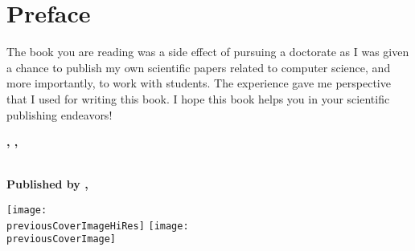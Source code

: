 

\chapter{Preface}\label{preface:cha}

The book you are reading was a side effect of pursuing a doctorate as I was given a chance to publish my own scientific papers related to computer science, and more importantly, to work with students. The experience gave me perspective that I used for writing this book. I hope this book helps you in your scientific publishing endeavors!

\noindent \textbf{\yourName}

\textbf{\yourCity, \yourCountry, \prefaceDate}



\hfil{}\hfil

\ifseries

\begin{center}
	

{}

~\\
\bfseries \small Published by \mypublishingcompany, \mypublishingcompanylocation\par

\ifxetex
    \texttt{[image: \\previousCoverImageHiRes]}
\else
    \texttt{[image: \\previousCoverImage]}
\fi
\end{center}
\fi
